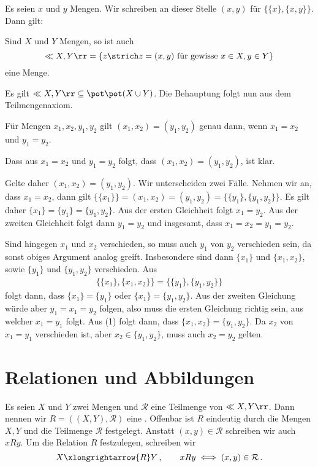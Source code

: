 Es seien $x$ und $y$ Mengen. Wir schreiben an dieser Stelle $(x,y)$ für $\{\{x\},\{x,y\}\}$. Dann gilt:

\begin{lem}
Sind $X$ und $Y$ Mengen, so ist auch
\[
\ll X,Y\rr=\left\{z\strich z=(x,y)\textnormal{ für gewisse }x\in X,y\in Y\right\}
\]
eine Menge.
\begin{bew}
Es gilt $\ll X,Y\rr\subseteq\pot\pot(X\cup Y)$. Die Behauptung folgt nun aus dem Teilmengenaxiom.
\end{bew}
\end{lem}

\begin{lem}
Für Mengen $x_1,x_2,y_1,y_2$ gilt $(x_1,x_2)=(y_1,y_2)$ genau dann, wenn $x_1=x_2$ und $y_1=y_2$.
\begin{bew}
Dass aus $x_1=x_2$ und $y_1=y_2$ folgt, dass $(x_1,x_2)=(y_1,y_2)$, ist klar.

Gelte daher $(x_1,x_2)=(y_1,y_2)$. Wir unterscheiden zwei Fälle. Nehmen wir an, dass $x_1=x_2$, dann gilt $\{\{x_1\}\}=(x_1,x_2)=(y_1,y_2)=\{\{y_1\},\{y_1,y_2\}\}$. Es gilt daher $\{x_1\}=\{y_1\}=\{y_1,y_2\}$. Aus der ersten Gleichheit folgt $x_1=y_2$. Aus der zweiten Gleichheit folgt dann $y_1=y_2$ und insgesamt, dass $x_1=x_2=y_1=y_2$.

Sind hingegen $x_1$ und $x_2$ verschieden, so muss auch $y_1$ von $y_2$ verschieden sein, da sonst obiges Argument analog greift. Insbesondere sind dann $\{x_1\}$ und $\{x_1,x_2\}$, sowie $\{y_1\}$ und $\{y_1,y_2\}$ verschieden. Aus
\begin{align}
\{\{x_1\},\{x_1,x_2\}\}=\{\{y_1\},\{y_1,y_2\}\}
\end{align}
folgt dann, dass $\{x_1\}=\{y_1\}$ oder $\{x_1\}=\{y_1,y_2\}$. Aus der zweiten Gleichung würde aber $y_1=x_1=y_2$ folgen, also muss die ersten Gleichung richtig sein, aus welcher $x_1=y_1$ folgt. Aus (1) folgt dann, dass $\{x_1,x_2\}=\{y_1,y_2\}$. Da $x_2$ von $x_1=y_1$ verschieden ist, aber $x_2\in\{y_1,y_2\}$, muss auch $x_2=y_2$ gelten.
\end{bew}
\end{lem}

\section{Relationen und Abbildungen}

Es seien $X$ und $Y$ zwei Mengen und $\mathcal{R}$ eine Teilmenge von $\ll X,Y\rr$. Dann nennen wir $R=((X,Y),\mathcal{R})$ eine . Offenbar ist $R$ eindeutig durch die Mengen $X,Y$ und die Teilmenge $\mathcal{R}$ festgelegt. Anstatt $(x,y)\in\mathcal{R}$ schreiben wir auch $xRy$. Um die Relation $R$ festzulegen, schreiben wir
\[
X\xlongrightarrow{R}Y\,,\qquad xRy\iff(x,y)\in\mathcal{R}\,.
\]


